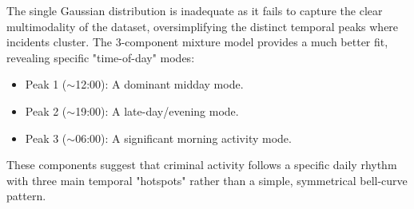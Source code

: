\documentclass{article}
\begin{document}
The single Gaussian distribution is inadequate as it fails to capture the clear multimodality of the dataset, oversimplifying the distinct temporal peaks where incidents cluster. The 3-component mixture model provides a much better fit, revealing specific "time-of-day" modes:
\begin{itemize}
\item Peak 1 ($\sim$12:00): A dominant midday mode.
\item Peak 2 ($\sim$19:00): A late-day/evening mode.
\item Peak 3 ($\sim$06:00): A significant morning activity mode.
\end{itemize}
These components suggest that criminal activity follows a specific daily rhythm with three main temporal "hotspots" rather than a simple, symmetrical bell-curve pattern.

\end{document}
